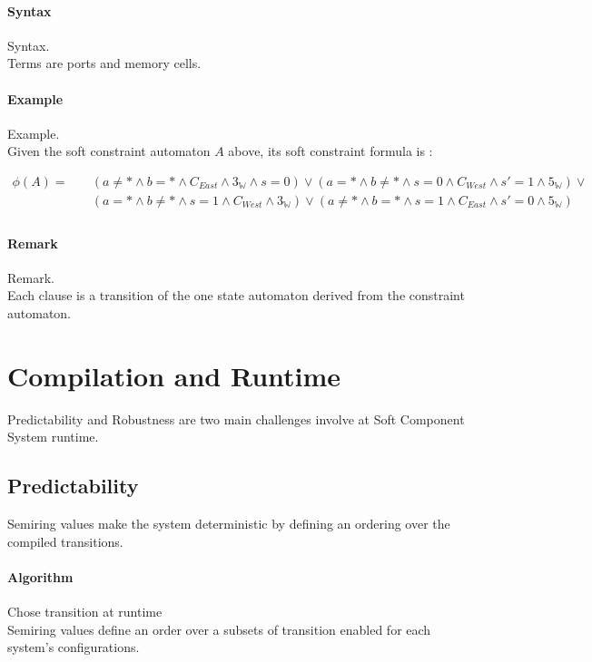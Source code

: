 \documentclass{article}
\theoremstyle{plain}
\theoremstyle{definition}
\begin{document}
\paragraph{Syntax} Syntax. \\
Terms are ports and memory cells. 

\paragraph{Example} Example. \\
Given the soft constraint automaton $A$ above, its soft constraint formula is :

\begin{align*}
\phi(A) =  & \quad ( a \not = * \land b = * \land C_{East} \land 3_\mathbb{W} \land s=0 ) \lor (a = * \land b \not = * \land s=0 \land C_{West} \land s'=1 \land 5_\mathbb{W}) \lor \\
		 & \quad (a = * \land b \not = *  \land s=1 \land C_{West} \land 3_\mathbb{W}) \lor (a \not = * \land b = * \land s=1 \land C_{East} \land s'=0 \land 5_\mathbb{W}) \\
\end{align*}

\paragraph{Remark} Remark. \\
Each clause is a transition of the one state automaton derived from the constraint automaton.

\section{Compilation and Runtime}
Predictability and Robustness are two main challenges involve at Soft Component System runtime.

\subsection{Predictability}
Semiring values make the system deterministic by defining an ordering over the compiled transitions.

\paragraph{Algorithm} Chose transition at runtime \\
Semiring values define an order over a subsets of transition enabled for each system's configurations.
\end{document}
